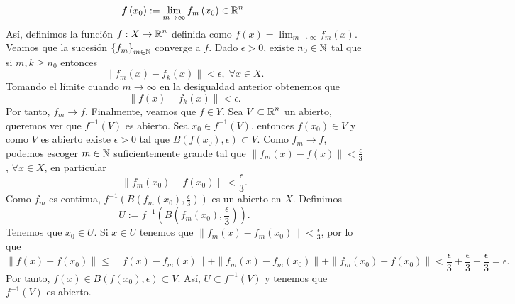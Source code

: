 \documentclass{article}
\begin{document}
\begin{sol}
\begin{itemize}
		\[f\left(x_{0}\right):=\lim_{m \to \infty}f_{m}\left(x_{0}\right) \in \mathbb{R}^{n} .\]
		Así, definimos la función $\displaystyle f : X \to \mathbb{R}^{n} $ definida como $\displaystyle f\left(x\right)=\lim_{m \to \infty}f_{m}\left(x\right) $. Veamos que la sucesión $\displaystyle \left\{ f_{m}\right\} _{m\in\mathbb{N}} $ converge a $\displaystyle f $. Dado $\displaystyle \epsilon > 0 $, existe $\displaystyle n_{0} \in \mathbb{N} $ tal que si $\displaystyle m,k \geq n_{0} $ entonces
		\[\|f_{m}\left(x\right)-f_{k}\left(x\right)\|<\epsilon, \; \forall x \in X .\]
		Tomando el límite cuando $\displaystyle m \to \infty $ en la desigualdad anterior obtenemos que
		\[\|f\left(x\right)-f_{k}\left(x\right)\|<\epsilon  .\]
		Por tanto, $\displaystyle f_{m} \to f $. Finalmente, veamos que $\displaystyle f \in Y $. Sea $\displaystyle V \subset \mathbb{R}^{n} $ un abierto, queremos ver que $\displaystyle f^{-1}\left(V\right) $ es abierto. Sea $\displaystyle x_{0} \in f^{-1}\left(V\right) $, entonces $\displaystyle f\left(x_{0}\right)\in V $ y como $\displaystyle V $ es abierto existe $\displaystyle \epsilon > 0 $ tal que $\displaystyle B\left(f\left(x_{0}\right), \epsilon \right)\subset V $. 
	Como $\displaystyle f_{m} \to f $, podemos escoger $\displaystyle m \in \mathbb{N} $ suficientemente grande tal que $\displaystyle \|f_{m}\left(x\right)-f\left(x\right)\|<\frac{\epsilon }{3} $, $\displaystyle \forall x \in X $, en particular
	\[\|f_{m}\left(x_{0}\right)-f\left(x_{0}\right)\|<\frac{\epsilon }{3} .\]
Como $\displaystyle f_{m} $ es continua, $\displaystyle f^{-1}\left(B\left(f_{m}\left(x_{0}\right), \frac{\epsilon }{3}\right)\right) $ es un abierto en $\displaystyle X $. Definimos
\[U :=f^{-1}\left(B\left(f_{m}\left(x_{0}\right), \frac{\epsilon }{3}\right)\right) .\]
Tenemos que $\displaystyle x_{0} \in  U $. Si $\displaystyle x \in U $ tenemos que $\displaystyle \|f_{m}\left(x\right)-f_{m}\left(x_{0}\right)\|<\frac{\epsilon }{3} $, por lo que 
\[\|f\left(x\right)-f\left(x_{0}\right)\| \leq \|f\left(x\right)-f_{m}\left(x\right)\| + \|f_{m}\left(x\right)-f_{m}\left(x_{0}\right)\| + \|f_{m}\left(x_{0}\right)-f\left(x_{0}\right)\| < \frac{\epsilon }{3} + \frac{\epsilon }{3} + \frac{\epsilon }{3}=\epsilon  .\]
Por tanto, $\displaystyle f\left(x\right)\in B\left(f\left(x_{0}\right), \epsilon \right)\subset V $. Así, $\displaystyle U \subset f^{-1}\left(V\right) $ y tenemos que $\displaystyle f^{-1}\left(V\right) $ es abierto. 
\end{itemize}
\end{sol}
\end{document}
